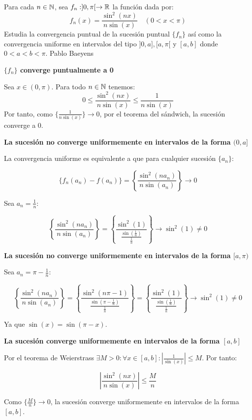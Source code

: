 \begin{ejercicio}{%
Para cada $n \in \mathbb{N}$, sea $f_n:]0,\pi[ \to \mathbb{R}$ la función dada por:
\[f_n(x) = \frac{\sin^2(nx)}{n\sin(x)} \quad (0 < x < \pi)\]
Estudia la convergencia puntual de la sucesión puntual $\{f_n\}$ así como la
convergencia uniforme en intervalos del tipo $]0,a], [a,\pi[$ y $[a,b]$ donde $0 < a< b < \pi$.
}{Pablo Baeyens}

\espacio

\noindent\textbf{$\{f_n\}$  converge puntualmente a 0}

Sea $x \in (0,\pi)$. Para todo $n \in \mathbb{N}$ tenemos:
\[ 0 \leq \frac{\sin^2(nx)}{n\sin(x)} \leq \frac{1}{n\sin(x)} \]
Por tanto, como $\{\frac{1}{n\sin(x)}\} \to 0$, por el teorema del sándwich, la
sucesión converge a 0.

\espacio

\noindent\textbf{La sucesión no converge uniformemente en intervalos de la forma $(0,a]$}

La convergencia uniforme es equivalente a que para cualquier sucesión $\{a_n\}$:

\[\{f_n(a_n) -f(a_n)\} = \left\{\frac{\sin^2(na_n)}{n\sin(a_n)}\right\} \to 0\]

Sea $a_n = \frac{1}{n}$:

\[ \left\{\frac{\sin^2(na_n)}{n\sin(a_n)}\right\}  =
\left\{\frac{\sin^2(1)}{\frac{\sin(\frac{1}{n})}{\frac{1}{n}}}\right\} \to \sin^2(1) \neq 0 \]

\espacio

\noindent\textbf{La sucesión no converge uniformemente en intervalos de la forma $[a,\pi)$}

Sea $a_n = \pi - \frac{1}{n}$:

\[ \left\{\frac{\sin^2(na_n)}{n\sin(a_n)}\right\}  =
\left\{\frac{\sin^2(n\pi -1)}{\frac{\sin(\pi -\frac{1}{n})}{\frac{1}{n}}}\right\} =
\left\{\frac{\sin^2(1)}{\frac{\sin(\frac{1}{n})}{\frac{1}{n}}}\right\} \to \sin^2(1) \neq 0 \]

Ya que $\sin(x) = \sin(\pi-x)$.

\espacio

\noindent\textbf{La sucesión converge uniformemente en intervalos de la forma $[a,b]$}

Por el teorema de Weierstrass
$\exists M >0: \forall x \in [a,b]: \left|\frac{1}{\sin(x)}\right| \leq M$. Por tanto:

\[ \left|\frac{\sin^2(nx)}{n\sin(x)}\right| \leq \frac{M}{n} \]

Como $\{\frac{M}{n}\} \to 0$, la sucesión converge uniformemente en intervalos
de la forma $[a,b]$.

\end{ejercicio}
 
